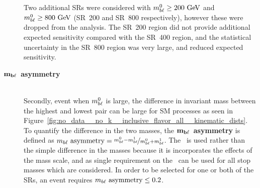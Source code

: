 \begin{description}
    Two additional SRs were considered with $\MBL^0 \geq 200 \GeV$ and
    $\MBL^0 \geq 800 \GeV$ (SR~200 and SR~800 respectively), however these
    were dropped from the analysis.
    The SR~200 region did not provide additional expected sensitivity compared
    with the SR~400 region, and the statistical uncertainty in the SR~800
    region was very large, and reduced expected sensitivity.
  \item[$\mathbf{m_{b\ell}}$~\textbf{asymmetry}] \hfill \\
    Secondly, event when $m_{b\ell}^{0}$ is large, the difference in invariant mass
    between the highest and lowest pair can be large for SM processes as seen
    in 
    Figure~\ref{fig:no_data__no_k__inclusive_flavor_all__kinematic_dists}.
    To quantify the difference in the two masses, the
    $\mathbf{m_{b\ell}}$~\textbf{asymmetry} is defined as
    $m_{b\ell}~\mathrm{asymmetry} = \nicefrac{m_{b\ell}^0-m_{b\ell}^1}{m_{b\ell}^0+m_{b\ell}^1}$.
    The \MBLASYM\ is used rather than the simple difference in the masses
    because it is incorporates the effects of the mass scale, and as single
    requirement on the \MBLASYM\ can be used for all stop masses which are
    considered.
    In order to be selected for one or both of the SRs, an event requires
    $m_{b\ell}~\mathrm{asymmetry} \leq 0.2$.
\end{description}



